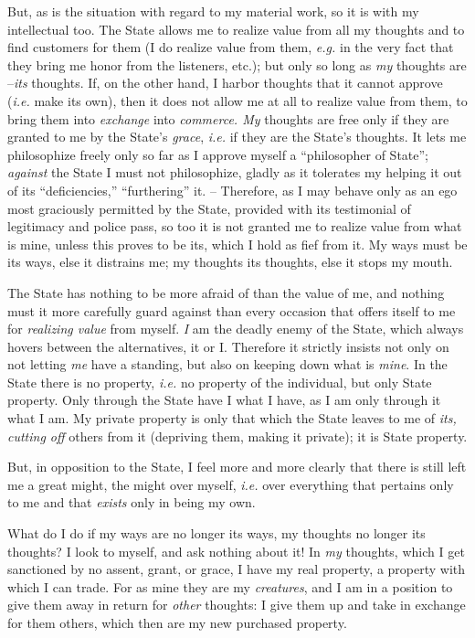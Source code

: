 But, as is the situation with regard to my material work, so it is with my 
intellectual too. The State allows me to realize value from all my thoughts 
and to find customers for them (I do realize value from them, \textit{e.g.} 
in the very fact that they bring me honor from the listeners, etc.); but only 
so long as \textit{my} thoughts are --\textit{its} thoughts. If, on the other 
hand, I harbor thoughts that it cannot approve (\textit{i.e.} make its own), 
then it does not allow me at all to realize value from them, to bring them 
into \textit{exchange} into \textit{commerce. My} thoughts are free only if 
they are granted to me by the State's \textit{grace}, \textit{i.e.} if they 
are the State's thoughts. It lets me philosophize freely only so far as I 
approve myself a ``philosopher of State''; \textit{against} the State I must 
not philosophize, gladly as it tolerates my helping it out of its 
``deficiencies,'' ``furthering'' it. -- Therefore, as I may behave only as 
an ego most graciously permitted by the State, provided with its testimonial 
of legitimacy and police pass, so too it is not granted me to realize value 
from what is mine, unless this proves to be its, which I hold as fief from it. 
My ways must be its ways, else it distrains me; my thoughts its thoughts, else 
it stops my mouth.

The State has nothing to be more afraid of than the value of me, and nothing 
must it more carefully guard against than every occasion that offers itself to 
me for \textit{realizing value} from myself. \textit{I} am the deadly enemy of 
the State, which always hovers between the alternatives, it or I. Therefore it 
strictly insists not only on not letting \textit{me} have a standing, but also 
on keeping down what is \textit{mine}. In the State there is no property, 
\textit{i.e.} no property of the individual, but only State property. Only 
through the State have I what I have, as I am only through it what I am. My 
private property is only that which the State leaves to me of \textit{its, 
cutting off} others from it (depriving them, making it private); it is State 
property.

But, in opposition to the State, I feel more and more clearly that there is 
still left me a great might, the might over myself, \textit{i.e.} over 
everything that pertains only to me and that \textit{exists} only in being my 
own.

What do I do if my ways are no longer its ways, my thoughts no longer its 
thoughts? I look to myself, and ask nothing about it! In \textit{my} thoughts, 
which I get sanctioned by no assent, grant, or grace, I have my real property, 
a property with which I can trade. For as mine they are my \textit{creatures}, 
and I am in a position to give them away in return for \textit{other} 
thoughts: I give them up and take in exchange for them others, which then are 
my new purchased property.

